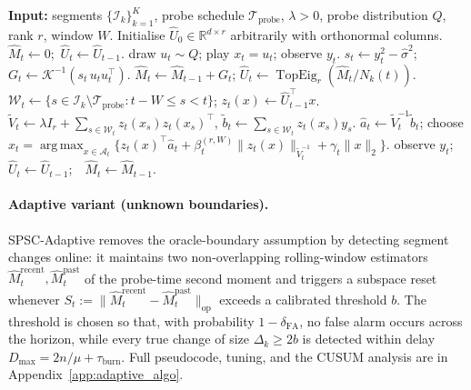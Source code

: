 \documentclass{article}
\newcommand{\R}{\mathbb{R}}
\newcommand{\op}{\mathrm{op}}
\newcommand{\cA}{\mathcal{A}}
\newcommand{\cI}{\mathcal{I}}
\newcommand{\cW}{\mathcal{W}}
\newcommand{\cTprobe}{\mathcal{T}_{\mathrm{probe}}}
\DeclareMathOperator{\TopEig}{TopEig}
\DeclareMathOperator*{\argmax}{arg\,max}
\begin{document}
\begin{algorithm}[t]
  \caption{\textbf{SPSC}: Single-Play Subspace-Calibrated Optimism (oracle boundaries)}
  \label{alg:spsc}
  \begin{algorithmic}[1]
  \State \textbf{Input:} segments $\{\cI_k\}_{k=1}^K$, probe schedule $\cTprobe$,
         $\lambda>0$, probe distribution $Q$, rank $r$, window $W$.
  \State Initialise $\widehat U_0\in\R^{d\times r}$ arbitrarily with orthonormal columns.
          \State $\widehat M_t\leftarrow 0$;\ $\widehat U_t \leftarrow \widehat U_{t-1}$.
      \EndIf
      \If{$t\in\cTprobe$}
          \State draw $u_t\sim Q$; play $x_t=u_t$; observe $y_t$.
          \State $s_t \leftarrow y_t^2 - \hat\sigma^2$;\quad
                 $G_t \leftarrow \mathcal K^{-1}(s_t\,u_tu_t^\top)$.
          \State $\widehat M_t \leftarrow \widehat M_{t-1} + G_t$;\quad
                 $\widehat U_t \leftarrow \TopEig_r(\widehat M_t / N_k(t))$.
      \Else{}
          \State $\cW_t \leftarrow \{s\in\cI_k\setminus\cTprobe : t{-}W \le s < t\}$;\quad
                 $z_t(x)\leftarrow \widehat U_{t-1}^\top x$.
          \State $\widetilde V_t \leftarrow \lambda I_r + \sum_{s\in\cW_t} z_t(x_s)z_t(x_s)^\top$,\quad
                 $\widetilde b_t \leftarrow \sum_{s\in\cW_t} z_t(x_s) y_s$.
          \State $\widehat a_t \leftarrow \widetilde V_t^{-1}\widetilde b_t$;\;
                 choose $x_t = \argmax_{x\in\cA_t}
                 \bigl\{ z_t(x)^\top\widehat a_t
                  + \beta_t^{(r,W)}\|z_t(x)\|_{\widetilde V_t^{-1}}
                  + \gamma_t\|x\|_2\bigr\}$.
          \State observe $y_t$;\ \ $\widehat U_t\leftarrow \widehat U_{t-1}$;\ \ $\widehat M_t\leftarrow \widehat M_{t-1}$.
      \EndIf
  \EndFor
  \end{algorithmic}
\end{algorithm}

\paragraph{Adaptive variant (unknown boundaries).}
SPSC-Adaptive removes the oracle-boundary assumption by detecting
segment changes online: it maintains two non-overlapping rolling-window
estimators $\widehat M_t^{\mathrm{recent}}, \widehat M_t^{\mathrm{past}}$ of
the probe-time second moment and triggers a subspace reset whenever
$S_t := \|\widehat M_t^{\mathrm{recent}} - \widehat M_t^{\mathrm{past}}\|_\op$
exceeds a calibrated threshold $b$. The threshold is chosen so that,
with probability $1-\delta_{\mathrm{FA}}$, no false alarm occurs across
the horizon, while every true change of size $\Delta_k \ge 2b$ is
detected within delay $D_{\max} = 2n/\mu + \tau_{\mathrm{burn}}$. Full
pseudocode, tuning, and the CUSUM analysis are in
Appendix~\ref{app:adaptive_algo}.
\end{document}
